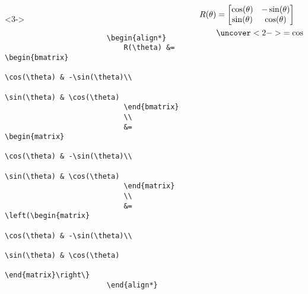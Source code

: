 \begin{frame}[fragile]
\begin{columns}
\begin{column}{0.5\textwidth}
\begin{adjustbox}{valign=T,set height=0pt,set depth=0.8\textheight,valign=B}
\begin{minipage}{0.9\textwidth}
\begin{onlyenv}
\begin{verbatim}
                    \end{verbatim}
                \end{onlyenv}%
                \fi
                \begin{onlyenv}<3->
                    \begin{verbatim}
                        \begin{align*}
                            R(\theta) &= \begin{bmatrix}
                                \cos(\theta) & -\sin(\theta)\\
                                \sin(\theta) & \cos(\theta)
                            \end{bmatrix}
                            \\
                            &= \begin{matrix}
                                \cos(\theta) & -\sin(\theta)\\
                                \sin(\theta) & \cos(\theta)
                            \end{matrix}
                            \\
                            &= \left(\begin{matrix}
                                \cos(\theta) & -\sin(\theta)\\
                                \sin(\theta) & \cos(\theta)
                            \end{matrix}\right\}
                        \end{align*}
                    \end{verbatim}
                \end{onlyenv}            
                \end{minipage}
            \end{adjustbox}
        \end{column}
        \begin{column}{0.5\textwidth}
            \begin{align*}
                R(\theta) &= \begin{bmatrix}
                    \cos(\theta) & -\sin(\theta)\\
                    \sin(\theta) & \cos(\theta)
                \end{bmatrix}\\
                &\uncover<2->{= \begin{matrix}
                    \cos(\theta) & -\sin(\theta)\\

\end{matrix}}
\end{align*}
\end{column}
\end{columns}
\end{frame}
